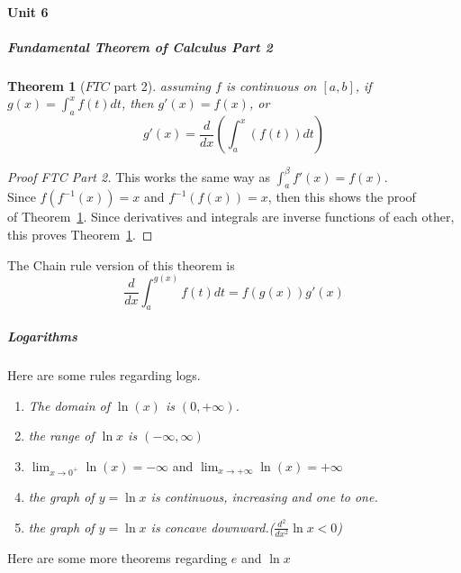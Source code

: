 \documentclass{article} %
\theoremstyle{theorem}
\newtheorem{theorem}{Theorem}[paragraph]
\theoremstyle{definition}
\begin{document}
            \paragraph{Unit 6}
                \subparagraph{Fundamental Theorem of Calculus Part 2}
                    \begin{theorem}[$FTC$ part 2]
                        \label{thm:FTCpt2}
                        assuming $f$ is continuous on $[a,b]$, if $g(x)=\int_{a}^{x}f(t)dt$, then $g'(x)=f(x)$, or \begin{equation} g'(x) = \frac{d}{dx}(\int_{a}^{x}(f(t))dt) \end{equation}
                    \end{theorem}
                    \begin{proof}[Proof FTC Part 2]
                        This works the same way as $\int_{a}^{\beta}f'(x)=f(x)$. \\Since $f(f^{-1}(x))=x$ and $f^{-1}(f(x))=x$, then this shows the proof \\of Theorem~\ref{thm:FTCpt2}.
                        Since derivatives and integrals are inverse functions of each other, this proves Theorem~\ref{thm:FTCpt2}.
                    \end{proof}
                    The Chain rule version of this theorem is \begin{equation}
                        \frac{d}{dx}\int_{a}^{g(x)}f(t)dt = f(g(x))g'(x)
                    \end{equation}
                \subparagraph{Logarithms}
                    Here are some rules regarding logs.
                    \begin{enumerate}
                        \item \textit{The domain of \emph{$\ln(x)$} is \emph{$(0,+\infty)$}.}
                        \item \textit{the range of \emph{$\ln x$} is $(-\infty,\infty)$}
                        \item $\lim_{x\rightarrow0^+}\ln(x)=-\infty$ and $\lim_{x\rightarrow+\infty}\ln(x)=+\infty$
                        \item \textit{the graph of \emph{$y=\ln x$} is continuous, increasing and one to one.}
                        \item \textit{the graph of \emph{$y=\ln x$} is concave downward.(\emph{$\frac{d^2}{dx^2}\ln x < 0$})}
                    \end{enumerate}
                    Here are some more theorems regarding $e$ and $\ln x$
\end{document}
